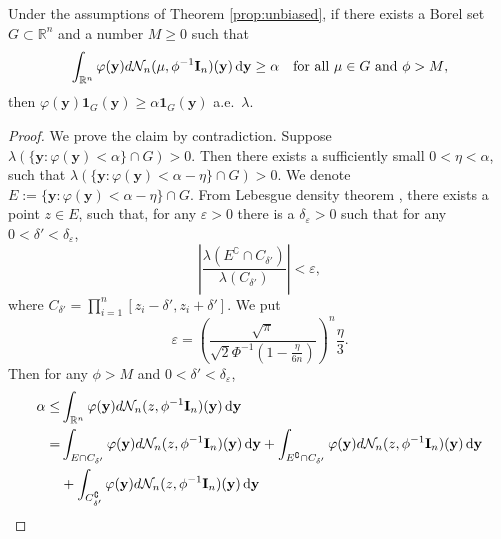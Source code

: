 \documentclass[smallextended]{svjour3}       %
\newcommand{\By}{\mathbf{y}}    \newcommand{\Bz}{\mathbf{z}}
\begin{document}
\begin{lemma}\label{Lemma:FF}
    Under the assumptions of Theorem \ref{prop:unbiased}, if there exists a Borel set $G\subset \mathbb R^n$ and a number $M\geq 0$ such that 
    \begin{equation*}
        \int_{\mathbb R^n} \varphi(\By) d\mathcal N_n(\mu,\phi^{-1} \BI_n)(\By)\, \mathrm{d} \By \geq \alpha\quad \text{for all $\mu \in G$ and $\phi >M$},
    \end{equation*}
    then $\varphi(\By)\mathbf 1_{G}(\By)\geq \alpha \mathbf 1_{G}(\By)$ a.e.\ $\lambda$.
\end{lemma}
\begin{proof}
    We prove the claim by contradiction.
    Suppose $\lambda(\{\By:\varphi (\By) <\alpha\} \cap G )>0$.
    Then there exists a sufficiently small $0< \eta <\alpha$, such that $\lambda(\{\By:\varphi (\By) <\alpha-\eta\} \cap G)>0$.
    We denote $ E:=\{\By:\varphi (\By) <\alpha-\eta\} \cap G$.
    From Lebesgue density theorem \citep[Corollary 6.2.6]{book:992991}, there exists a point $z\in  E$, such that, for any $\varepsilon >0$ there is a $\delta_{\varepsilon}>0$ such that for any $0 < \delta' <\delta_\varepsilon$,
    \begin{equation*}
        \left|\frac{\lambda(E^\complement\cap C_{\delta'})}{\lambda(C_{\delta'})}\right|<\varepsilon,
    \end{equation*}
    where $C_{\delta'}=\prod_{i=1}^n [z_i-{\delta'}, z_i + {\delta'}]$.
    We put
    \begin{equation*}
        \varepsilon=\left(\frac{\sqrt \pi}{\sqrt 2 \Phi^{-1}\left(1-\frac{\eta}{6n}\right)}\right)^n \frac{\eta}{3}.
    \end{equation*}
    Then for any $\phi>M$ and $0<\delta' <\delta_\varepsilon$,
    \begin{equation*}
        \begin{split}
            \alpha \leq& 
            \int_{\mathbb R^n}\varphi(\By) d\mathcal N_n (z, \phi^{-1} \BI_n) (\By)\,\mathrm{d} \By
            \\
            =&
            \int_{E\cap C_{\delta'}}\varphi(\By) d\mathcal N_n (z, \phi^{-1} \BI_n) (\By)\,\mathrm{d} \By
            +
            \int_{E^\complement\cap C_{\delta'}}\varphi(\By) d\mathcal N_n (z, \phi^{-1} \BI_n) (\By)\,\mathrm{d} \By
            \\
            &+
            \int_{C_{\delta'}^\complement}\varphi(\By) d\mathcal N_n (z, \phi^{-1} \BI_n) (\By)\,\mathrm{d} \By

\end{split}
\end{equation*}
\end{proof}
\end{document}
